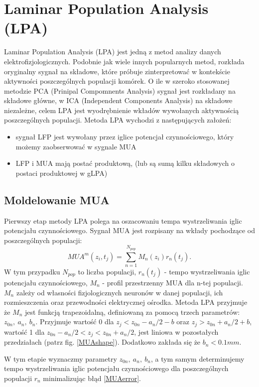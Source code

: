 \section{Laminar Population Analysis (LPA)}
Laminar Population Analysis (LPA) \cite{Einevoll2007} jest jedną z metod analizy danych elektrofizjologicznych. Podobnie jak wiele innych popularnych metod, rozkłada oryginalny sygnał na składowe, które próbuje zinterpretować w kontekście aktywności poszczególnych populacji komórek. O ile w szeroko stosowanej metodzie PCA (Prinipal Compomnents Analysis) sygnał jest rozkładany na składowe główne, w ICA (Independent Components Analysis) na składowe niezależne, celem LPA jest wyodrębnienie wkładów wywołanych aktywnością poszczególnych populacji. Metoda LPA wychodzi z następujących założeń:
\begin{itemize}
\item sygnał LFP jest wywołany przez iglice potencjał czynnościowego, który możemy zaobserwować w sygnale MUA
\item LFP i MUA mają postać produktową,  (lub są sumą kilku składowych o postaci produktowej w gLPA)
\end{itemize}
\subsection{Moldelowanie MUA}
Pierwszy etap metody LPA polega na oszacowaniu tempa wystrzeliwania iglic potencjału czynnościowego. Sygnał MUA jest rozpisany na wkłady pochodzące od poszczególnych populacji:
\begin{equation}
MUA^m(z_i, t_j) = \sum^{N_{pop}}_{n=1} M_n(z_i)r_n(t_j).
\label{MUAdecomposition}
\end{equation}
W tym przypadku $N_{pop}$ to liczba populacji, $r_n(t_j)$ - tempo wystrzeliwania iglic potencjału czynnościowego,  $M_n$ - profil przestrzenny MUA dla n-tej populacji. $M_n$ zależy od własności fizjologicznych neuronów w danej populacji, ich rozmieszczenia oraz przewodności elektrycznej ośrodka. Metoda LPA przyjmuje że $M_n$ jest funkcją trapezoidalną, definiowaną za pomocą trzech parametrów: $z_{0n}, \ a_n, \ b_n$. Przyjmuje wartość 0 dla $z_{j}< z_{0n} - a_n/2 - b$ oraz $z_{j} > z_{0n} + a_n/2 + b$, wartość 1 dla $z_{0n} - a_n/2 < z_j < z_{0n} + a_n/2$, jest liniowa w pozostałych przedziałach (patrz fig. \ref{MUAshape}). Dodatkowo zakłada się że $b_n < 0.1 mm$.

W tym etapie wyznaczmy parametry $z_{0n}, \ a_n, \ b_n$, a tym samym determinujemy tempo wystrzeliwania iglic potencjału czynnościowego dla poszczególnych populacji $r_n$ minimalizując błąd \ref{MUAerror}.

